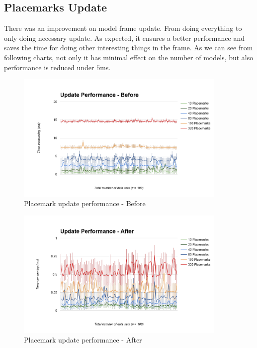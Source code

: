 \subsection{Placemarks Update}
\label{section:placemarks-update}

There was an improvement on model frame update. From doing everything to only doing necessary update. As expected, it ensures a better performance and saves the time for doing other interesting things in the frame. As we can see from following charts, not only it has minimal effect on the number of models, but also performance is reduced under $5$ms.
 
\begin{figure}[H]
	\caption{Placemark update performance - Before}
	\label{fig:placemark-update-performance-before}
	\centering
	\includegraphics[width=0.9\textwidth, keepaspectratio]{Figures/placemark-update-performance-before.png}
	\decoRule
\end{figure}

\begin{figure}[H]
	\caption{Placemark update performance - After}
	\label{fig:placemark-update-performance-after}
	\centering
	\includegraphics[width=0.9\textwidth, keepaspectratio]{Figures/placemark-update-performance-after.png}
	\decoRule
\end{figure}

